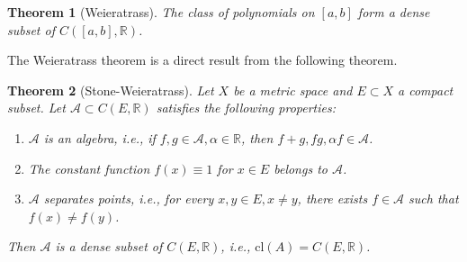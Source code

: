 \documentclass[12pt,leqno]{amsart}
\newtheorem{theorem}{Theorem}[section]
\theoremstyle{definition}
\numberwithin{equation}{subsection}
\begin{document}
\begin{theorem}[Weieratrass]
The class of polynomials on $[a,b]$ form a dense subset of $C\left([a,b],\mathbb{R}\right)$.
\end{theorem}

The Weieratrass theorem is a direct result from the following theorem.

\begin{theorem}[Stone-Weieratrass]
Let $X$ be a metric space and $E\subset X$ a compact subset. Let $\mathcal{A}\subset C(E,\mathbb{R})$ satisfies the following properties:
\begin{enumerate}
    \item $\mathcal{A}$ is an algebra, i.e., if $f,g\in \mathcal{A}, \alpha\in\mathbb{R}$, then $f+g,fg,\alpha f\in\mathcal{A}$.
    \item The constant function $f(x)\equiv 1$ for $x\in E$ belongs to $\mathcal{A}$.
    \item $\mathcal{A}$ separates points, i.e., for every $x,y\in E, x\neq y$, there exists $f\in\mathcal{A}$ such that $f(x)\neq f(y)$.
\end{enumerate}
Then $\mathcal{A}$ is a dense subset of $C(E,\mathbb{R})$, i.e., $\text{cl}(A) = C(E,\mathbb{R})$.
\end{theorem}
\end{document}
